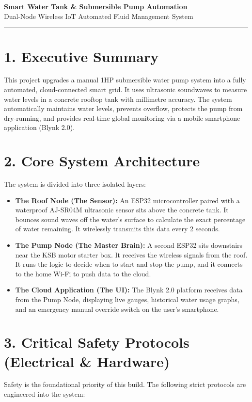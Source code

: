 \documentclass[11pt, a4paper]{article}
\begin{document}
\begin{center}
    {\Huge \textcolor{primary}{\textbf{Smart Water Tank \& Submersible Pump Automation}}} \\[0.5em]
    {\Large \textcolor{secondary}{Dual-Node Wireless IoT Automated Fluid Management System}} \\[1em]
    \rule{\textwidth}{0.4pt}
\end{center}

\vspace{1em}

\section*{1. Executive Summary}
This project upgrades a manual 1HP submersible water pump system into a fully automated, cloud-connected smart grid. It uses ultrasonic soundwaves to measure water levels in a concrete rooftop tank with millimetre accuracy. The system automatically maintains water levels, prevents overflow, protects the pump from dry-running, and provides real-time global monitoring via a mobile smartphone application (Blynk 2.0).

\section*{2. Core System Architecture}
The system is divided into three isolated layers:
\begin{itemize}
    \item \textbf{The Roof Node (The Sensor):} An ESP32 microcontroller paired with a waterproof AJ-SR04M ultrasonic sensor sits above the concrete tank. It bounces sound waves off the water's surface to calculate the exact percentage of water remaining. It wirelessly transmits this data every 2 seconds.
    \item \textbf{The Pump Node (The Master Brain):} A second ESP32 sits downstairs near the KSB motor starter box. It receives the wireless signals from the roof. It runs the logic to decide when to start and stop the pump, and it connects to the home Wi-Fi to push data to the cloud.
    \item \textbf{The Cloud Application (The UI):} The Blynk 2.0 platform receives data from the Pump Node, displaying live gauges, historical water usage graphs, and an emergency manual override switch on the user's smartphone.
\end{itemize}

\section*{3. Critical Safety Protocols (Electrical \& Hardware)}
Safety is the foundational priority of this build. The following strict protocols are engineered into the system:
\end{document}
